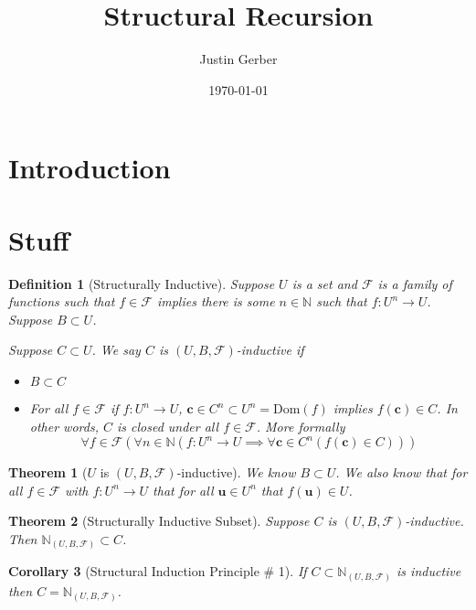 \documentclass[12pt]{article}
\theoremstyle{break}
\newtheorem{definition}{Definition}[section]
\theoremstyle{break}
\newtheorem{theorem}{Theorem}[section]
\theoremstyle{break}
\newtheorem{corollary}[theorem]{Corollary}
\theoremstyle{break}
\theoremstyle{break}
\newtheorem{informal definition}[definition]{Informal Definition}
\newcommand{\bv}[1]{\boldsymbol{#1}}
\begin{document}
\title{Structural Recursion}
\author{Justin Gerber}
\date{\today}
\maketitle

\section{Introduction}

\section{Stuff}

\begin{definition}[Structurally Inductive]
Suppose $U$ is a set and $\mathcal{F}$ is a family of functions such that $f \in \mathcal{F}$ implies there is some $n\in \mathbb{N}$ such that $f: U^n \to U$.
Suppose $B \subset U$.

Suppose $C \subset U$.
We say $C$ is $(U, B, \mathcal{F})$-inductive if
\begin{itemize}
\item{$B\subset C$}
\item{For all $f\in \mathcal{F}$ if $f:U^n\to U$, $\bv{c}\in C^n \subset U^n = \text{Dom}(f)$ implies $f(\bv{c})\in C$. In other words, $C$ is closed under all $f\in \mathcal{F}$. More formally
$$
\forall f\in \mathcal{F}(\forall n\in \mathbb{N}(f:U^n \to U \implies \forall \bv{c} \in C^n (f(\bv{c}) \in C)))
$$}
\end{itemize}
\end{definition}

\begin{theorem}[$U$ is $(U, B, \mathcal{F})$-inductive]
\label{thm:Uinductive}
We know $B\subset U$.
We also know that for all $f\in \mathcal{F}$ with $f:U^n \to U$ that for all $\bv{u}\in U^n$ that $f(\bv{u}) \in U$.
\end{theorem}


\begin{theorem}[Structurally Inductive Subset]
\label{thm:indsubset}
Suppose $C$ is $(U, B, \mathcal{F})$-inductive.
Then $\mathbb{N}_{(U, B, \mathcal{F})} \subset C$.
\end{theorem}

\begin{corollary}[Structural Induction Principle \# 1]
If $C\subset\mathbb{N}_{(U, B, \mathcal{F})}$ is inductive then $C = \mathbb{N}_{(U, B, \mathcal{F})}$.
\end{corollary}
\end{document}
